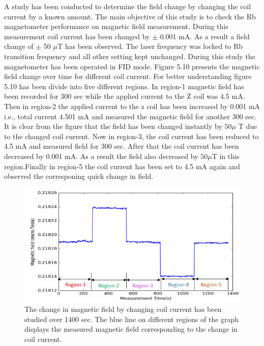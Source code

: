 \documentclass[12pt]{report}
\begin{document}
\begin{itemize}
 A study has been conducted to determine the field change by changing the coil current by a known amount. The main objective of this study is to check the Rb magnetometer performance on magnetic field measurement. During this measurement coil current has been changed by $\pm$ 0.001 mA. As a result a field change of $\pm$ 50  $\mu$T  has been observed. The laser frequency was locked to Rb transition frequency and all other setting kept unchanged. During this study the magnetometer has been operated in FID mode. Figure 5.10 presents the magnetic field change over time for different coil current. For better understanding figure 5.10 has been divide into five different regions. In region-1 magnetic field  has been recorded for 300 sec while the applied current to the Z coil was 4.5 mA. Then in region-2 the applied current to the z coil has been increased by 0.001 mA i.e., total current 4.501 mA and measured the magnetic field for another 300 sec. It is clear from the figure that the field has been changed instantly by $50 \mu$ T due to the changed coil current. Now in region-3, the coil current has been reduced to 4.5 mA and measured field for 300 sec. After that the coil current has been decreased by 0.001 mA. As a result the field also decreased by $50 \mu$T in this region.Finally in region-5 the coil current has been set to 4.5 mA again and observed the corresponing quick change in field.

   \begin{figure}[h]
\centering\includegraphics[width=0.7\linewidth]{figures/field_change_with_current}
\caption{The change in magnetic field  by changing coil current has been studied over 1400 sec. The blue line on different regions of the graph displays the measured magnetic field corresponding to the change in coil current. }
\end{figure}
   \end{itemize}
\end{document}

